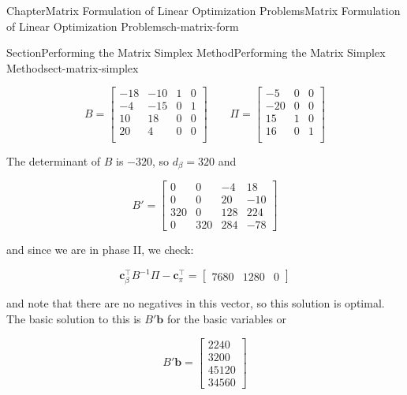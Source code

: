 \documentclass[oneside,10pt,]{book}
\numberwithin{equation}{section}
\newcommand{\amp}{&}
\begin{document}
\begin{chapterptx}{Chapter}{Matrix Formulation of Linear Optimization Problems}{}{Matrix Formulation of Linear Optimization Problems}{}{}{ch-matrix-form}
\begin{sectionptx}{Section}{Performing the Matrix Simplex Method}{}{Performing the Matrix Simplex Method}{}{}{sect-matrix-simplex}
\begin{introduction}{}
\begin{enumerate}
\begin{equation*}
B = \begin{bmatrix} -18 \amp -10 \amp 1 \amp 0 \\ -4 \amp -15 \amp 0 \amp 1 \\ 10 \amp  18 \amp 0 \amp 0 \\ 20 \amp   4 \amp 0 \amp 0 \\ \end{bmatrix} \qquad \Pi = \begin{bmatrix} -5 \amp 0 \amp 0 \\ -20 \amp 0 \amp 0 \\ 15 \amp 1 \amp 0 \\ 16 \amp 0 \amp 1 \\ \end{bmatrix}
\end{equation*}
%
\par
The determinant of \(B\) is \(-320\), so \(d_{\beta}=320\) and%
\par
%
\begin{equation*}
B' = \begin{bmatrix} 0 \amp   0 \amp  -4 \amp  18 \\ 0 \amp   0 \amp  20 \amp -10 \\ 320 \amp   0 \amp 128 \amp 224 \\ 0 \amp 320 \amp 284 \amp -78 \end{bmatrix}
\end{equation*}
%
\par
and since we are in phase II, we check:%
\par
%
\begin{equation*}
\boldsymbol{c}_{\beta}^{\intercal}B^{-1}\Pi - \boldsymbol{c}_{\pi}^{\intercal} = \begin{bmatrix} 7680 \amp 1280 \amp 0 \end{bmatrix}
\end{equation*}
%
\par
and note that there are no negatives in this vector, so this solution is optimal. The basic solution to this is \(B' \boldsymbol{b}\) for the basic variables or%
\par
%
\begin{equation*}
B' \boldsymbol{b} = \begin{bmatrix} 2240 \\ 3200 \\ 45120 \\ 34560 \end{bmatrix}
\end{equation*}
%
\par

\end{enumerate}
\end{introduction}
\end{sectionptx}
\end{chapterptx}
\end{document}
